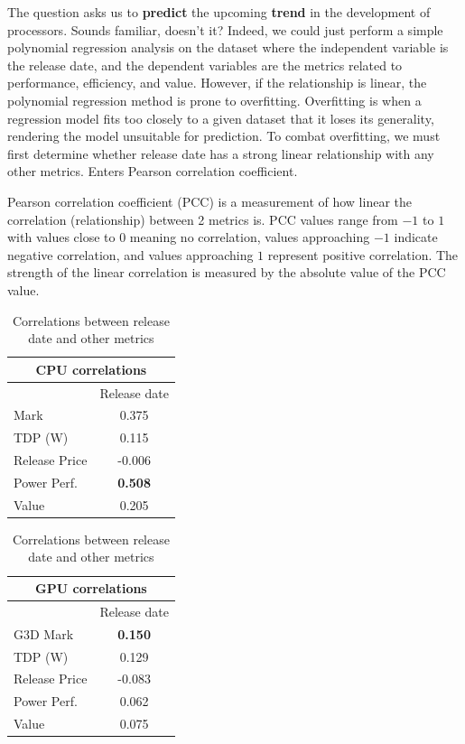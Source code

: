 \documentclass[conference]{IEEEtran}
\begin{document}
The question asks us to \textbf{predict} the upcoming \textbf{trend} in the
development of processors. Sounds familiar, doesn't it? Indeed, we could just
perform a simple polynomial regression analysis on the dataset where the
independent variable is the release date, and the dependent variables are the
metrics related to performance, efficiency, and value. However, if the
relationship is linear, the polynomial regression method is prone to overfitting.
Overfitting is when a regression model fits too closely to a given dataset that
it loses its generality, rendering the model unsuitable for prediction. To
combat overfitting, we must first determine whether release date has a strong
linear relationship with any other metrics. Enters Pearson correlation
coefficient.

Pearson correlation coefficient (PCC) is a measurement of how linear the
correlation (relationship) between 2 metrics is. PCC values range from
$-1$ to $1$ with values close to $0$ meaning no correlation, values
approaching $-1$ indicate negative correlation, and values approaching $1$
represent positive correlation. The strength of the linear correlation is
measured by the absolute value of the PCC value.

\begin{table}[htbp]
	\caption{Correlations between release date and other metrics}
	\begin{center}
		\begin{tabular}[t]{|l|c|}
			\hline
			\multicolumn{2}{|c|}{\textbf{CPU correlations}} \\
			\hline
			              & Release date                    \\
			\hline
			Mark          & 0.375                           \\
			\hline
			TDP (W)       & 0.115                           \\
			\hline
			Release Price & -0.006                          \\
			\hline
			Power Perf.   & \textbf{0.508}                  \\
			\hline
			Value         & 0.205                           \\
			\hline
		\end{tabular}
		\quad
		\begin{tabular}[t]{|l|c|}
			\hline
			\multicolumn{2}{|c|}{\textbf{GPU correlations}} \\
			\hline
			              & Release date                    \\
			\hline
			G3D Mark      & \textbf{0.150}                  \\
			\hline
			TDP (W)       & 0.129                           \\
			\hline
			Release Price & -0.083                          \\
			\hline
			Power Perf.   & 0.062                           \\
			\hline
			Value         & 0.075                           \\
			\hline
		\end{tabular}
	\end{center}
	\label{tab1}
\end{table}
\end{document}
